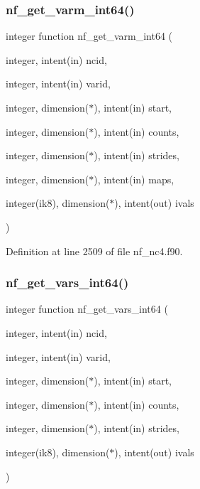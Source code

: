 \subsubsection{\texorpdfstring{nf\+\_\+get\+\_\+varm\+\_\+int64()}{nf\_get\_varm\_int64()}}
{\footnotesize\ttfamily integer function nf\+\_\+get\+\_\+varm\+\_\+int64 (\begin{DoxyParamCaption}\item[{integer, intent(in)}]{ncid,  }\item[{integer, intent(in)}]{varid,  }\item[{integer, dimension($\ast$), intent(in)}]{start,  }\item[{integer, dimension($\ast$), intent(in)}]{counts,  }\item[{integer, dimension($\ast$), intent(in)}]{strides,  }\item[{integer, dimension($\ast$), intent(in)}]{maps,  }\item[{integer(ik8), dimension($\ast$), intent(out)}]{ivals }\end{DoxyParamCaption})}



Definition at line 2509 of file nf\+\_\+nc4.\+f90.

\mbox{\label{nf__nc4_8f90_a14e8b971183e4cd5884f770a766be78b}} 
\subsubsection{\texorpdfstring{nf\+\_\+get\+\_\+vars\+\_\+int64()}{nf\_get\_vars\_int64()}}
{\footnotesize\ttfamily integer function nf\+\_\+get\+\_\+vars\+\_\+int64 (\begin{DoxyParamCaption}\item[{integer, intent(in)}]{ncid,  }\item[{integer, intent(in)}]{varid,  }\item[{integer, dimension($\ast$), intent(in)}]{start,  }\item[{integer, dimension($\ast$), intent(in)}]{counts,  }\item[{integer, dimension($\ast$), intent(in)}]{strides,  }\item[{integer(ik8), dimension($\ast$), intent(out)}]{ivals }\end{DoxyParamCaption})}




